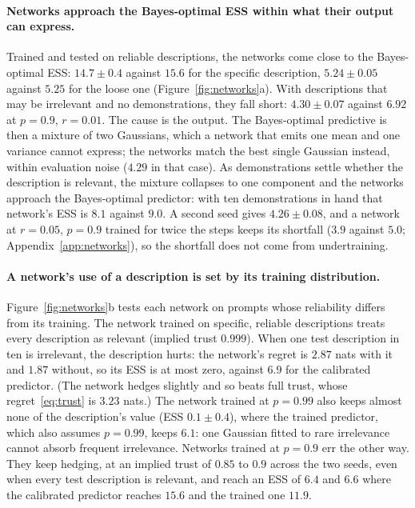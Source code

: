 \documentclass{article}
\begin{document}
\paragraph{Networks approach the Bayes-optimal ESS within what their output can express.} Trained and tested on reliable descriptions, the networks come close to the Bayes-optimal ESS: $14.7 \pm 0.4$ against $15.6$ for the specific description, $5.24 \pm 0.05$ against $5.25$ for the loose one (Figure~\ref{fig:networks}a). With descriptions that may be irrelevant and no demonstrations, they fall short: $4.30 \pm 0.07$ against $6.92$ at $p = 0.9$, $r = 0.01$. The cause is the output. The Bayes-optimal predictive is then a mixture of two Gaussians, which a network that emits one mean and one variance cannot express; the networks match the best single Gaussian instead, within evaluation noise ($4.29$ in that case). As demonstrations settle whether the description is relevant, the mixture collapses to one component and the networks approach the Bayes-optimal predictor: with ten demonstrations in hand that network's ESS is $8.1$ against $9.0$. A second seed gives $4.26 \pm 0.08$, and a network at $r = 0.05$, $p = 0.9$ trained for twice the steps keeps its shortfall ($3.9$ against $5.0$; Appendix~\ref{app:networks}), so the shortfall does not come from undertraining.

\paragraph{A network's use of a description is set by its training distribution.} Figure~\ref{fig:networks}b tests each network on prompts whose reliability differs from its training. The network trained on specific, reliable descriptions treats every description as relevant (implied trust $0.999$). When one test description in ten is irrelevant, the description hurts: the network's regret is $2.87$ nats with it and $1.87$ without, so its ESS is at most zero, against $6.9$ for the calibrated predictor. (The network hedges slightly and so beats full trust, whose regret~\eqref{eq:trust} is $3.23$ nats.) The network trained at $p = 0.99$ also keeps almost none of the description's value (ESS $0.1 \pm 0.4$), where the trained predictor, which also assumes $p = 0.99$, keeps $6.1$: one Gaussian fitted to rare irrelevance cannot absorb frequent irrelevance. Networks trained at $p = 0.9$ err the other way. They keep hedging, at an implied trust of $0.85$ to $0.9$ across the two seeds, even when every test description is relevant, and reach an ESS of $6.4$ and $6.6$ where the calibrated predictor reaches $15.6$ and the trained one $11.9$.
\end{document}
